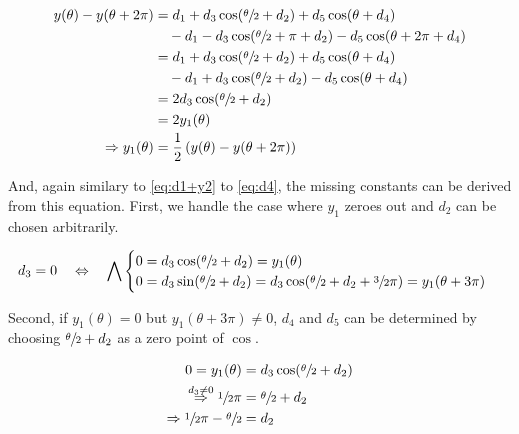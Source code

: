 \begin{equation}
    \label{eq:y1}
    \begin{split}
        y(\theta) - y(\theta + 2\pi)
            &= d_1 + d_3 \cos(\sfrac\theta2 + d_2) + d_5 \cos(\theta + d_4)\\
                &\quad - d_1 - d_3 \cos(\sfrac\theta2 + \pi + d_2) - d_5 \cos(\theta + 2\pi + d_4)\\
            &= d_1 + d_3 \cos(\sfrac\theta2 + d_2) + d_5 \cos(\theta + d_4)\\
                &\quad - d_1 + d_3 \cos(\sfrac\theta2 + d_2) - d_5 \cos(\theta + d_4)\\
            &= 2 d_3 \cos(\sfrac\theta2 + d_2)\\
            &= 2 y_1(\theta)\\
        \Rightarrow y_1(\theta) &= \frac12\left(y(\theta) - y(\theta + 2\pi)\right)
    \end{split}
\end{equation}

And, again similary to \ref{eq:d1+y2} to \ref{eq:d4}, the missing constants can
be derived from this equation.
First, we handle the case where $y_1$ zeroes out and $d_2$ can be chosen
arbitrarily.

\begin{equation}
    \label{eq:d3-0}
    d_3 = 0 \quad\Leftrightarrow\quad \bigwedge
    \begin{cases}
        0 = d_3 \cos(\sfrac\theta2 + d_2) = y_1(\theta) \\
        0 = d_3 \sin(\sfrac\theta2 + d_2) = d_3 \cos(\sfrac\theta2 + d_2 + \sfrac32\pi) = y_1(\theta + 3\pi)
    \end{cases}
\end{equation}

Second, if $y_1(\theta) = 0$ but $y_1(\theta + 3\pi) \neq 0$, $d_4$ and $d_5$ can
be determined by choosing $\sfrac\theta2 + d_2$ as a zero point of $\cos$.

\begin{equation}
    \label{eq:whateverman-the-second}
    \begin{split}
        0 = y_1(\theta) &= d_3 \cos(\sfrac\theta2 + d_2)\\
        \stackrel{d_3 \neq 0}\Rightarrow \sfrac12\pi &= \sfrac\theta2 + d_2\\
        \Rightarrow \sfrac12\pi - \sfrac\theta2 &= d_2
    \end{split}
\end{equation}

